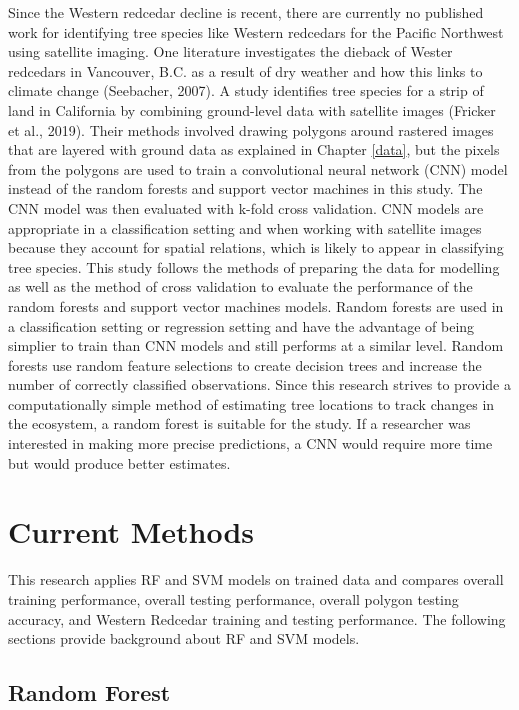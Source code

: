 \documentclass[12pt,twoside]{reedthesis}
\begin{document}
Since the Western redcedar decline is recent, there are currently no published work for identifying tree species like Western redcedars for the Pacific Northwest using satellite imaging. One literature investigates the dieback of Wester redcedars in Vancouver, B.C. as a result of dry weather and how this links to climate change (Seebacher, 2007). A study identifies tree species for a strip of land in California by combining ground-level data with satellite images (Fricker et al., 2019). Their methods involved drawing polygons around rastered images that are layered with ground data as explained in Chapter \ref{data}, but the pixels from the polygons are used to train a convolutional neural network (CNN) model instead of the random forests and support vector machines in this study. The CNN model was then evaluated with k-fold cross validation. CNN models are appropriate in a classification setting and when working with satellite images because they account for spatial relations, which is likely to appear in classifying tree species. This study follows the methods of preparing the data for modelling as well as the method of cross validation to evaluate the performance of the random forests and support vector machines models. Random forests are used in a classification setting or regression setting and have the advantage of being simplier to train than CNN models and still performs at a similar level. Random forests use random feature selections to create decision trees and increase the number of correctly classified observations. Since this research strives to provide a computationally simple method of estimating tree locations to track changes in the ecosystem, a random forest is suitable for the study. If a researcher was interested in making more precise predictions, a CNN would require more time but would produce better estimates.

\hypertarget{current-methods}{%
\section{Current Methods}\label{current-methods}}

This research applies RF and SVM models on trained data and compares overall training performance, overall testing performance, overall polygon testing accuracy, and Western Redcedar training and testing performance. The following sections provide background about RF and SVM models.

\hypertarget{random-forest}{%
\subsection{Random Forest}\label{random-forest}}
\end{document}

